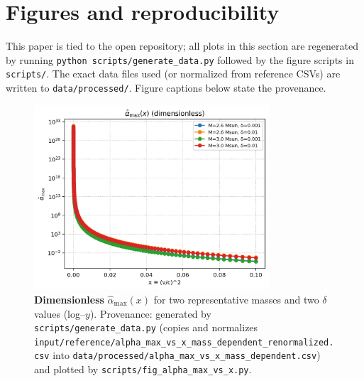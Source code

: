 \documentclass{iopjournal}
\begin{document}

\section{Figures and reproducibility}\label{sec:figs}
This paper is tied to the open repository; all plots in this section are regenerated by running \texttt{python scripts/generate\_data.py} followed by the figure scripts in \texttt{scripts/}. The exact data files used (or normalized from reference CSVs) are written to \texttt{data/processed/}. Figure captions below state the provenance.

\begin{figure}[H]
  \centering
  \includegraphics[width=0.78\textwidth]{alpha_max_vs_x.png}
  \caption{\textbf{Dimensionless} $\hat\alpha_{\max}(x)$ for two representative masses and two $\delta$ values (log–$y$). Provenance: generated by \texttt{scripts/generate\_data.py} (copies and normalizes \texttt{input/reference/alpha\_max\_vs\_x\_mass\_dependent\_renormalized.csv} into \texttt{data/processed/alpha\_max\_vs\_x\_mass\_dependent.csv}) and plotted by \texttt{scripts/fig\_alpha\_max\_vs\_x.py}.}
  \label{fig:alpha_x}
\end{figure}
\end{document}
